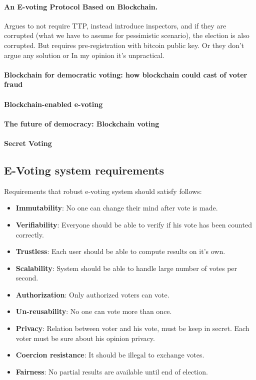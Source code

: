 \documentclass[runningheads]{llncs}
\begin{document}
\paragraph{An E-voting Protocol Based on Blockchain. ~\cite{liu2017voting}}
Argues to not require TTP, instead introduce inspectors, and if they are corrupted (what we have to assume for pessimistic scenario), the election is also corrupted. But requires pre-registration with bitcoin public key. Or they don't argue any solution or In my opinion it's unpractical.

\paragraph{Blockchain for democratic voting: how blockchain could cast of voter fraud ~\cite{casado2018blockchain} }

\paragraph{Blockchain-enabled e-voting ~\cite{kshetri2018blockchain} }

\paragraph{The future of democracy: Blockchain voting ~\cite{osgood2016future}}

\paragraph{Secret Voting ~\cite{tam_2018} }

\subsection{E-Voting system requirements}
Requirements that robust e-voting system should satisfy follows:
\begin{itemize}
\item \textbf{Immutability}: No one can change their mind after vote is made.
\item \textbf{Verifiability}: Everyone should be able to verify if his vote has been counted correctly.
\item \textbf{Trustless}: Each user should be able to compute results on it's own.
\item \textbf{Scalability}: System should be able to handle large number of votes per second.
\item \textbf{Authorization}: Only authorized voters can vote.
\item \textbf{Un-reusability}: No one can vote more than once.
\item \textbf{Privacy}: Relation between voter and his vote, must be keep in secret. Each voter must be sure about his opinion privacy. 
\item \textbf{Coercion resistance}: It should be illegal to exchange votes.
\item \textbf{Fairness}: No partial results are available until end of election.
\end{itemize}
\end{document}
